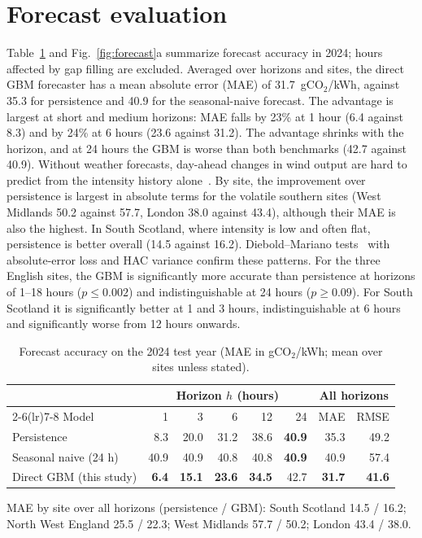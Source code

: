 \section{Forecast evaluation}\label{app:forecast}

Table~\ref{tab:forecast} and Fig.~\ref{fig:forecast}a summarize forecast accuracy in 2024; hours affected by gap filling are excluded. Averaged over horizons and sites, the direct GBM forecaster has a mean absolute error (MAE) of 31.7~gCO$_2$/kWh, against 35.3 for persistence and 40.9 for the seasonal-naive forecast. The advantage is largest at short and medium horizons: MAE falls by 23\% at 1 hour (6.4 against 8.3) and by 24\% at 6 hours (23.6 against 31.2). The advantage shrinks with the horizon, and at 24 hours the GBM is worse than both benchmarks (42.7 against 40.9). Without weather forecasts, day-ahead changes in wind output are hard to predict from the intensity history alone~\cite{maji2022carboncast}. By site, the improvement over persistence is largest in absolute terms for the volatile southern sites (West Midlands 50.2 against 57.7, London 38.0 against 43.4), although their MAE is also the highest. In South Scotland, where intensity is low and often flat, persistence is better overall (14.5 against 16.2). Diebold--Mariano tests~\cite{diebold1995comparing} with absolute-error loss and HAC variance confirm these patterns. For the three English sites, the GBM is significantly more accurate than persistence at horizons of 1--18 hours ($p\le0.002$) and indistinguishable at 24 hours ($p\ge0.09$). For South Scotland it is significantly better at 1 and 3 hours, indistinguishable at 6 hours and significantly worse from 12 hours onwards.

\begin{table}[!htbp]
\centering
\caption{Forecast accuracy on the 2024 test year (MAE in gCO$_2$/kWh; mean over sites unless stated).}
\label{tab:forecast}
\small
\begin{tabular}{lrrrrrrr}
\toprule
 & \multicolumn{5}{c}{Horizon $h$ (hours)} & \multicolumn{2}{c}{All horizons} \\
\cmidrule(lr){2-6}\cmidrule(lr){7-8}
Model & 1 & 3 & 6 & 12 & 24 & MAE & RMSE \\
\midrule
Persistence & 8.3 & 20.0 & 31.2 & 38.6 & \textbf{40.9} & 35.3 & 49.2 \\
Seasonal naive (24 h) & 40.9 & 40.9 & 40.8 & 40.8 & \textbf{40.9} & 40.9 & 57.4 \\
Direct GBM (this study) & \textbf{6.4} & \textbf{15.1} & \textbf{23.6} & \textbf{34.5} & 42.7 & \textbf{31.7} & \textbf{41.6} \\
\bottomrule
\end{tabular}

\smallskip
\parbox{0.92\textwidth}{\footnotesize MAE by site over all horizons (persistence / GBM): South Scotland 14.5 / 16.2; North West England 25.5 / 22.3; West Midlands 57.7 / 50.2; London 43.4 / 38.0.}
\end{table}

